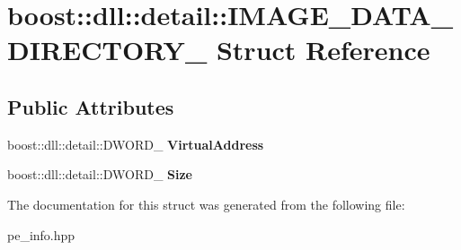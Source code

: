 \hypertarget{a01592}{}\section{boost\+:\+:dll\+:\+:detail\+:\+:I\+M\+A\+G\+E\+\_\+\+D\+A\+T\+A\+\_\+\+D\+I\+R\+E\+C\+T\+O\+R\+Y\+\_\+ Struct Reference}
\label{a01592}
\subsection*{Public Attributes}
\begin{DoxyCompactItemize}
\item 
\mbox{\label{a01592_a340957aec7b2353ade198ca79186141e}} 
boost\+::dll\+::detail\+::\+D\+W\+O\+R\+D\+\_\+ {\bfseries Virtual\+Address}
\item 
\mbox{\label{a01592_a713c3c47477c9d0f55009f8dcfa1bcd0}} 
boost\+::dll\+::detail\+::\+D\+W\+O\+R\+D\+\_\+ {\bfseries Size}
\end{DoxyCompactItemize}


The documentation for this struct was generated from the following file\+:\begin{DoxyCompactItemize}
\item 
pe\+\_\+info.\+hpp\end{DoxyCompactItemize}
